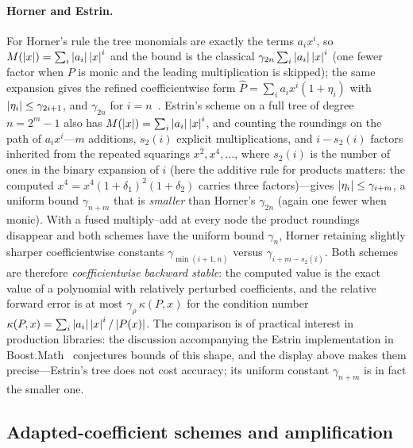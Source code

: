 \paragraph{Horner and Estrin.}
For Horner's rule the tree monomials are exactly the terms $a_ix^i$, so
$M(\left\lvert x\right\rvert)=\sum_i\left\lvert a_i\right\rvert\left\lvert x\right\rvert^i$ and the bound is the classical
$\gamma_{2n}\sum_i\left\lvert a_i\right\rvert\left\lvert x\right\rvert^i$ (one fewer factor when $P$ is monic and
the leading multiplication is skipped); the same expansion gives the refined
coefficientwise form $\widehat P=\sum_i a_ix^i(1+\eta_i)$ with
$\left\lvert \eta_i\right\rvert\le\gamma_{2i+1}$, and $\gamma_{2n}$ for
$i=n$~\cite[\S5.1]{higham2002accuracy}.  Estrin's scheme on a full tree of
degree $n=2^m-1$ also has $M(\left\lvert x\right\rvert)=\sum_i\left\lvert a_i\right\rvert\left\lvert x\right\rvert^i$, and counting
the roundings on the path of $a_ix^i$---$m$ additions, $s_2(i)$ explicit
multiplications, and $i-s_2(i)$ factors inherited from the repeated squarings
$x^2,x^4,\dots$, where $s_2(i)$ is the number of ones in the binary expansion
of $i$ (here the additive rule for products matters: the computed
$x^4=x^4(1+\delta_1)^2(1+\delta_2)$ carries three factors)---gives
$\left\lvert \eta_i\right\rvert\le\gamma_{i+m}$, a uniform bound $\gamma_{n+m}$ that is
\emph{smaller} than Horner's $\gamma_{2n}$ (again one fewer when monic).  With
a fused multiply--add at every node the product roundings disappear and both
schemes have the uniform bound $\gamma_n$, Horner retaining slightly sharper
coefficientwise constants $\gamma_{\min(i+1,n)}$ versus
$\gamma_{i+m-s_2(i)}$.  Both schemes are therefore \emph{coefficientwise
backward stable}: the computed value is the exact value of a polynomial with
relatively perturbed coefficients, and the relative forward error is at most
$\gamma_\rho\,\kappa(P,x)$ for the condition number
$\kappa(P,x)=\sum_i\left\lvert a_i\right\rvert\left\lvert x\right\rvert^i/\left\lvert P(x)\right\rvert$.  The comparison is of
practical interest in production libraries: the discussion accompanying the
Estrin implementation in Boost.Math~\cite{boostmath932} conjectures bounds of
this shape, and the display above makes them precise---Estrin's tree does not
cost accuracy; its uniform constant $\gamma_{n+m}$ is in fact the smaller
one.

\subsection{Adapted-coefficient schemes and amplification}

